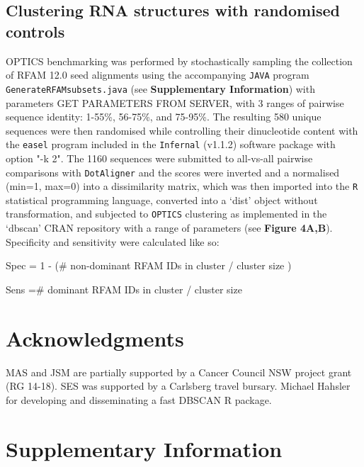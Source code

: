\documentclass[a4paper,11pt]{article}
\newcommand\dotaligner{\texttt{DotAligner}}
\begin{document}
{\subsection*{ Clustering RNA structures with randomised controls }
OPTICS benchmarking was performed by stochastically sampling the collection of RFAM 12.0 
seed alignments using the accompanying \texttt{JAVA} program \texttt{GenerateRFAMsubsets.java}
(see \textbf{Supplementary Information}) with parameters {\color{red} GET PARAMETERS FROM SERVER}, 
with 3 ranges of pairwise sequence identity: 1-55\%, 56-75\%, and 75-95\%.  The resulting
580 unique sequences were then randomised while controlling their dinucleotide content with 
the \texttt{easel} program included in the \texttt{Infernal} (v1.1.2) software package 
\cite{nawrocki2013infernal} with option "-k 2". The 1160 sequences were submitted to 
all-vs-all pairwise comparisons with \dotaligner{} and the scores were inverted and a 
normalised (min=1, max=0) into a dissimilarity matrix, which was then imported into
 the \texttt{R} statistical programming language, converted into a `dist' object without
 transformation, and subjected to \texttt{OPTICS} clustering as implemented
in the `dbscan' CRAN repository with a range of parameters (see \textbf{Figure 4A,B}).\\

 Specificity and sensitivity were calculated like so: 

Spec  = 1 - (\# non-dominant RFAM IDs in cluster /  cluster size )

Sens =\# dominant RFAM IDs in cluster / cluster size 



\section*{ Acknowledgments }
MAS and JSM are partially supported  by a Cancer Council NSW project grant (RG 14-18). 
SES was supported by a Carlsberg travel bursary. 
Michael Hahsler for developing and disseminating a fast DBSCAN R package.

 


\newpage 
\section*{ Supplementary Information }

}
\end{document}
